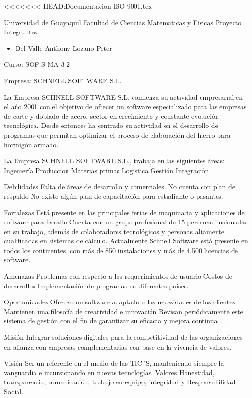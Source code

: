 <<<<<<< HEAD:Documentacion ISO 9001.tex
\begin{center}
Universidad de Guayaquil
Facultad de Ciencias Matematicas y Fisicas
Proyecto
Integrantes:
\begin{itemize}
	\item Del Valle Anthony
Lozano Peter
\end{itemize}
Curso: SOF-S-MA-3-2
\end{center}

Empresa: SCHNELL SOFTWARE S.L.


La Empresa SCHNELL SOFTWARE S.L. comienza su actividad empresarial en el año 2001 con el objetivo de ofrecer un software especializado para las empresas de corte y doblado de acero, sector en crecimiento y constante evolución tecnológica. Desde entonces ha centrado su actividad en el desarrollo de programas que permitan optimizar el proceso de elaboración del hierro para hormigón armado.

La Empresa SCHNELL SOFTWARE S.L., trabaja en las siguientes áreas:
Ingeniería
Produccion
Materias primas
Logistica
Gestión
Integración 

Debilidades
Falta de áreas de desarrollo y comerciales.
No cuenta con plan de respaldo
No existe algún plan de capacitación para estudiante o pasantes.

Fortalezas
Está presente en las principales ferias de maquinaria y aplicaciones de software para ferralla
Cuenta con un grupo profesional de 15 personas ilusionadas en su trabajo, además de colaboradores tecnológicos y personas altamente cualificadas en sistemas de cálculo.
Actualmente Schnell Software está presente en todos los continentes, con más de 850 instalaciones y más de 4.500 licencias de software.

Amenazas
Problemas con respecto a los requerimientos de usuario
Costos de desarrollos 
Implementación de programas en diferentes países.

Oportunidades
Ofrecen un software adaptado a las necesidades de los clientes
Mantienen una filosofía de creatividad e innovación 
Revisan periódicamente este sistema de gestión con el fin de garantizar su eficacia y mejora continua.

Misión
Integrar soluciones digitales para la competitividad de las organizaciones en alianza con empresas complementarias con base en la vivencia de valores.

Visión
Ser un referente en el medio de las TIC´S, manteniendo siempre la vanguardia e incursionando en nuevas tecnologías. 
Valores
Honestidad, transparencia, comunicación, trabajo en equipo, integridad y Responsabilidad Social.
 
